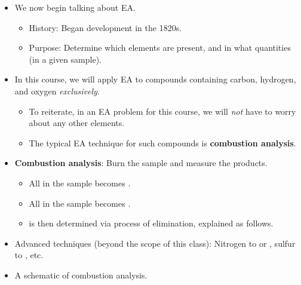 \documentclass[../notes.tex]{subfiles}
\begin{document}
\begin{itemize}
\begin{enumerate}
        \begin{itemize}
            \item Questions to answer: Do we have ketones? Esters? Alcohols? Rings?
            \item Relevant tools: MS, infrared spectroscopy (IR), and nuclear magnetic resonance (NMR).\footnote{NMR is an organic chemist's best friend!}
        \end{itemize}
        \item Identify how all the functional groups fit together.
        \begin{itemize}
            \item Questions to answer: Are they close? Far apart? Ortho/meta/para? What stereochemistry?
            \item Relevant tools: NMR and X-ray diffraction.
        \end{itemize}
    \end{enumerate}
    \item We now begin talking about EA.
    \begin{itemize}
        \item History: Began development in the 1820s.
        \item Purpose: Determine which elements are present, and in what quantities (in a given sample).
    \end{itemize}
    \item In this course, we will apply EA to compounds containing carbon, hydrogen, and oxygen \emph{exclusively}.
    \begin{itemize}
        \item To reiterate, in an EA problem for this course, we will \emph{not} have to worry about any other elements.
        \item The typical EA technique for such compounds is \textbf{combustion analysis}.
    \end{itemize}
    \item \textbf{Combustion analysis}: Burn the sample and measure the products.
    \begin{itemize}
        \item All  in the sample becomes .
        \item All  in the sample becomes .
        \item {} is then determined via process of elimination, explained as follows.
    \end{itemize}
    \item Advanced techniques (beyond the scope of this class): Nitrogen to  or , sulfur to , etc.
    \item A schematic of combustion analysis.
    \begin{figure}[h!]
        \centering
\end{figure}
\end{itemize}
\end{document}
